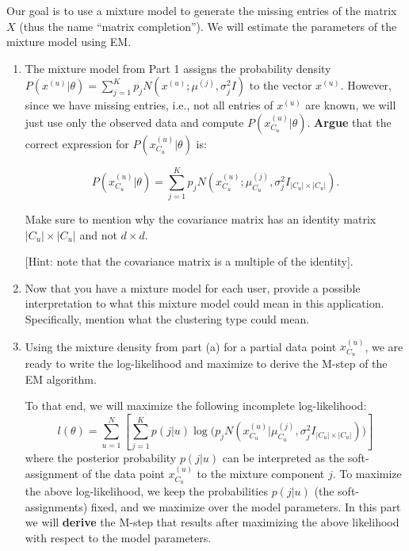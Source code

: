 \begin{enumerate}
Our goal is to use a mixture model to generate the missing entries of the matrix $X$ (thus the name ``matrix completion''). We will estimate the parameters of the mixture model using EM.

\begin{enumerate}
\item The mixture model from Part 1 assigns the probability density $P(x^{(u)} | \theta) = \sum^{K}_{j=1} p_j N(x^{(u)}; \mu^{(j)}, \sigma^2_j I)$ to the vector $x^{(u)}$. However, since we have missing entries, i.e., not all entries of $x^{(u)}$ are known, we will just use only the observed data and compute $P(x^{(u)}_{C_u} | \theta)$. \textbf{Argue} that the correct expression for $P(x^{(u)}_{C_u}  | \theta)$ is:

 $$P(x^{(u)}_{C_u}  | \theta) = \sum^{K}_{j=1} p_j N(x^{(u)}_{C_u} ; \mu^{(j)}_{C_u} , \sigma^2_j I_{|C_u| \times |C_u|}).$$ 
 
Make sure to mention why the covariance matrix has an identity matrix $ |C_u| \times |C_u| $ and not $ d \times d $.
 
 [Hint: note that the covariance matrix is a multiple of the identity].

 
 \item Now that you have a mixture model for each user, provide a possible interpretation to what this mixture model could mean in this application. Specifically, mention what the clustering type could mean.

\item Using the mixture density from part (a) for a partial data point $x^{(u)}_{C_u}$, we are ready to write the log-likelihood and maximize to derive the M-step of the EM algorithm. 
\color{black}

To that end, we will maximize the following incomplete log-likelihood:
$$ l(\theta) = \sum_{u=1}^N \left[ \sum^{K}_{j=1} p(j|u) \log\bigl( p_j N(x^{(u)}_{C_u} | \mu^{(j)}_{C_u}, \sigma^2_j I_{|C_u| \times |C_u|} ) \bigr) \right]$$
where the posterior probability $p(j|u)$ can be interpreted as the soft-assignment of the data point $x^{(u)}_{C_u}$ to the mixture component $j$. To maximize the above log-likelihood, we keep the probabilities $p(j|u)$ (the soft-assignments) fixed, and we maximize over the model parameters. In this part we will \textbf{derive} the M-step that results after maximizing the above likelihood with respect to the model parameters.


\end{enumerate}
\end{enumerate}
